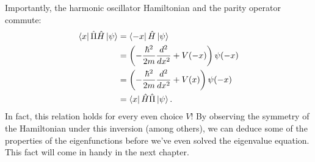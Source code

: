 \documentclass[../p116main.tex]{subfiles}
\begin{document}
Importantly, the harmonic oscillator Hamiltonian and the parity operator commute:
\begin{align*}
    \left< x \right| \hat \Pi \hat H \left| \psi \right> &= \left< -x \right| \hat H \left| \psi \right> \\
    &= \left( -\frac{\hbar^2}{2m} \frac{d^2}{dx^2} + V(-x) \right) \psi(-x) \\
    &= \left( -\frac{\hbar^2}{2m} \frac{d^2}{dx^2} + V(x) \right) \psi(-x) \\
    &= \left< x \right| \hat H \hat \Pi \left| \psi \right>.
\end{align*}
In fact, this relation holds for every even choice $V$!
By observing the symmetry of the Hamiltonian under this inversion (among others), we can deduce some of the properties of the eigenfunctions before we've even solved the eigenvalue equation.
This fact will come in handy in the next chapter.
\end{document}
